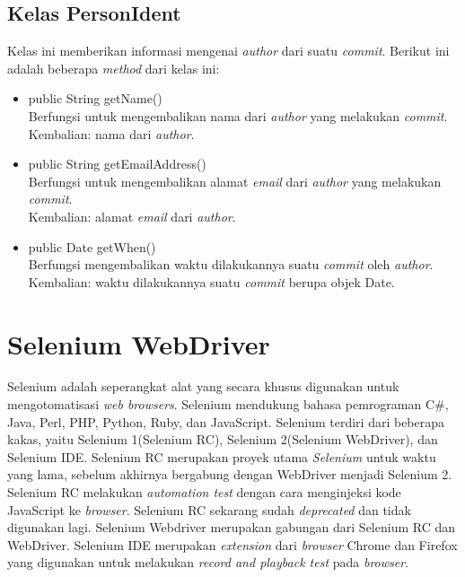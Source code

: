 \subsection{Kelas PersonIdent}
\label{subsec:personident}
Kelas ini memberikan informasi mengenai \textit{author} dari suatu \textit{commit}. Berikut ini adalah beberapa \textit{method} dari kelas ini:
\begin{itemize}
\item public String getName()\\
Berfungsi untuk mengembalikan nama dari \textit{author} yang melakukan \textit{commit}.\\
Kembalian: nama dari \textit{author}.

\item public String getEmailAddress()\\
Berfungsi untuk mengembalikan alamat \textit{email} dari \textit{author} yang melakukan \textit{commit}.\\
Kembalian: alamat \textit{email} dari \textit{author}.

\item public Date getWhen()\\
Berfungsi mengembalikan waktu dilakukannya suatu \textit{commit} oleh \textit{author}.\\
Kembalian: waktu dilakukannya suatu \textit{commit} berupa objek Date.
\end{itemize}

\section{Selenium WebDriver}
\label{sec:selenium_webdriver}
Selenium adalah seperangkat alat yang secara khusus digunakan untuk mengotomatisasi \textit{web browsers}\cite{Selenium}. Selenium mendukung bahasa pemrograman C\#, Java, Perl, PHP, Python, Ruby, dan JavaScript. Selenium terdiri dari beberapa kakas, yaitu Selenium 1(Selenium RC), Selenium 2(Selenium WebDriver), dan Selenium IDE. Selenium RC merupakan proyek utama \textit{Selenium} untuk waktu yang lama, sebelum akhirnya bergabung dengan WebDriver menjadi Selenium 2. Selenium RC melakukan \textit{automation test} dengan cara menginjeksi kode JavaScript ke \textit{browser}. Selenium RC sekarang sudah \textit{deprecated} dan tidak digunakan lagi. Selenium Webdriver merupakan gabungan dari Selenium RC dan WebDriver. Selenium IDE merupakan \textit{extension} dari \textit{browser} Chrome dan Firefox yang digunakan untuk melakukan \textit{record and playback test} pada \textit{browser}. 
 
